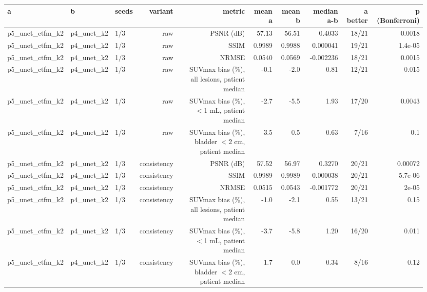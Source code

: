 \begin{tabular}{lllrrrrrrr}
\toprule
a & b & seeds & variant & metric & mean a & mean b & median a-b & a better & p (Bonferroni) \\
\midrule
p5\_unet\_ctfm\_k2 & p4\_unet\_k2 & 1/3 & raw & PSNR (dB) & 57.13 & 56.51 & 0.4033 & 18/21 & 0.0018 \\
p5\_unet\_ctfm\_k2 & p4\_unet\_k2 & 1/3 & raw & SSIM & 0.9989 & 0.9988 & 0.000041 & 19/21 & 1.4e-05 \\
p5\_unet\_ctfm\_k2 & p4\_unet\_k2 & 1/3 & raw & NRMSE & 0.0540 & 0.0569 & -0.002236 & 18/21 & 0.0015 \\
p5\_unet\_ctfm\_k2 & p4\_unet\_k2 & 1/3 & raw & SUVmax bias (\%), all lesions, patient median & -0.1 & -2.0 & 0.81 & 12/21 & 0.015 \\
p5\_unet\_ctfm\_k2 & p4\_unet\_k2 & 1/3 & raw & SUVmax bias (\%), $<$1 mL, patient median & -2.7 & -5.5 & 1.93 & 17/20 & 0.0043 \\
p5\_unet\_ctfm\_k2 & p4\_unet\_k2 & 1/3 & raw & SUVmax bias (\%), bladder $<$2 cm, patient median & 3.5 & 0.5 & 0.63 & 7/16 & 0.1 \\
p5\_unet\_ctfm\_k2 & p4\_unet\_k2 & 1/3 & consistency & PSNR (dB) & 57.52 & 56.97 & 0.3270 & 20/21 & 0.00072 \\
p5\_unet\_ctfm\_k2 & p4\_unet\_k2 & 1/3 & consistency & SSIM & 0.9989 & 0.9989 & 0.000038 & 20/21 & 5.7e-06 \\
p5\_unet\_ctfm\_k2 & p4\_unet\_k2 & 1/3 & consistency & NRMSE & 0.0515 & 0.0543 & -0.001772 & 20/21 & 2e-05 \\
p5\_unet\_ctfm\_k2 & p4\_unet\_k2 & 1/3 & consistency & SUVmax bias (\%), all lesions, patient median & -1.0 & -2.1 & 0.55 & 13/21 & 0.15 \\
p5\_unet\_ctfm\_k2 & p4\_unet\_k2 & 1/3 & consistency & SUVmax bias (\%), $<$1 mL, patient median & -3.7 & -5.8 & 1.20 & 16/20 & 0.011 \\
p5\_unet\_ctfm\_k2 & p4\_unet\_k2 & 1/3 & consistency & SUVmax bias (\%), bladder $<$2 cm, patient median & 1.7 & 0.0 & 0.34 & 8/16 & 0.12 \\
\bottomrule
\end{tabular}
